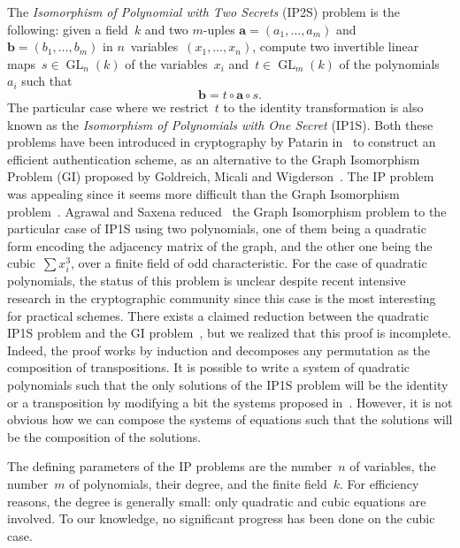 \documentclass{lms}
\DeclareMathOperator\GL{GL}
\begin{document}
The \emph{Isomorphism of Polynomial with Two Secrets} (IP2S) problem is
the following: given a field~$k$ and two $m$-uples $\bm{a} = (a_1, …,
a_m)$ and~$\bm{b} = (b_1, …, b_m)$ in $n$~variables~$(x_1, …, x_n)$, compute
two invertible linear maps~$s ∈ \GL_n(k)$ of the variables~$x_i$
and~$t ∈ \GL_m(k)$ of the polynomials~$a_i$ such that
\begin{equation*}
\bm{b} = t ∘ \bm{a} ∘ s.
\end{equation*}
The particular case where we restrict~$t$ to the identity transformation
is also known as the \emph{Isomorphism of Polynomials with One Secret}
(IP1S). Both these problems have been introduced in cryptography by
Patarin in~\cite{DBLP:conf/eurocrypt/Patarin96} to construct an efficient
authentication scheme, 
as an alternative to the Graph Isomorphism Problem (GI) proposed by Goldreich, Micali and Wigderson~\cite{DBLP:journals/jacm/GoldreichMW91}.
The IP problem was appealing since 
it seems more difficult than the Graph Isomorphism problem~\cite{DBLP:conf/eurocrypt/PatarinGC98}. 
Agrawal and Saxena reduced~\cite{DBLP:conf/stacs/AgrawalS06} the Graph
Isomorphism problem to the particular case of IP1S using two polynomials,
one of them being a quadratic form encoding the adjacency matrix of the
graph, and the other one being the cubic~$\sum x_i^3$, over a finite field of
odd characteristic.
For the case of quadratic polynomials, the status of this problem is unclear despite recent 
intensive research in the cryptographic community since this case is the most interesting 
for practical schemes. There exists a claimed reduction between the quadratic IP1S problem and the GI
problem~\cite{DBLP:conf/eurocrypt/PatarinGC98}, but we realized that this proof is incomplete. 
Indeed, the proof works by induction and decomposes any permutation as the composition of 
transpositions. It is possible to write a system of quadratic polynomials such that the only solutions 
of the IP1S problem will be the identity or a transposition by modifying a bit the systems proposed 
in~\cite{DBLP:conf/eurocrypt/PatarinGC98}. However, it is not obvious how we can compose the systems 
of equations such that the solutions will be the composition of the solutions. 

\bigbreak

The defining parameters of the IP problems are the number~$n$ of
variables, the number~$m$ of polynomials, their degree, and the finite
field~$k$.
For efficiency reasons, the degree is generally small:
only quadratic and cubic equations are involved.
To our knowledge, no significant progress has been done on the cubic case.
\end{document}
